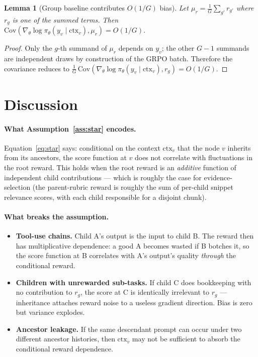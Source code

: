 \documentclass[11pt]{article}
\newtheorem{lemma}[theorem]{Lemma}
\begin{document}
\begin{lemma}[Group baseline contributes $O(1/G)$ bias]
\label{lem:obg}
Let $\mu_r = \tfrac{1}{G}\sum_{g'} r_{g'}$ where $r_g$ is one of the summed
terms. Then $\mathrm{Cov}(\nabla_\theta \log \pi_\theta(y_v \mid \mathrm{ctx}_v),
\mu_r) = O(1/G)$.
\end{lemma}

\begin{proof}
Only the $g$-th summand of $\mu_r$ depends on $y_v$; the other $G-1$ summands
are independent draws by construction of the GRPO batch. Therefore the
covariance reduces to $\tfrac{1}{G}\,\mathrm{Cov}(\nabla_\theta \log \pi_\theta(y_v
\mid \mathrm{ctx}_v),r_g) = O(1/G)$.
\end{proof}

\section*{Discussion}

\paragraph{What Assumption~\ref{ass:star} encodes.} Equation~\eqref{eq:star}
says: conditional on the context $\mathrm{ctx}_v$ that the node $v$ inherits
from its ancestors, the score function at $v$ does not correlate with
fluctuations in the root reward. This holds when the root reward is an
\emph{additive} function of independent child contributions --- which is
roughly the case for evidence-selection (the parent-rubric reward is roughly
the sum of per-child snippet relevance scores, with each child responsible
for a disjoint chunk).

\paragraph{What breaks the assumption.}
\begin{itemize}
\item \textbf{Tool-use chains.} Child A's output is the input to child B. The
      reward then has multiplicative dependence: a good A becomes wasted if B
      botches it, so the score function at B correlates with A's output's
      quality \emph{through} the conditional reward.
\item \textbf{Children with unrewarded sub-tasks.} If child C does
      bookkeeping with no contribution to $r_g$, the score at C is
      identically irrelevant to $r_g$ --- inheritance attaches reward noise to
      a useless gradient direction. Bias is zero but variance explodes.
\item \textbf{Ancestor leakage.} If the same descendant prompt can occur
      under two different ancestor histories, then $\mathrm{ctx}_v$ may not
      be sufficient to absorb the conditional reward dependence.
\end{itemize}
\end{document}
